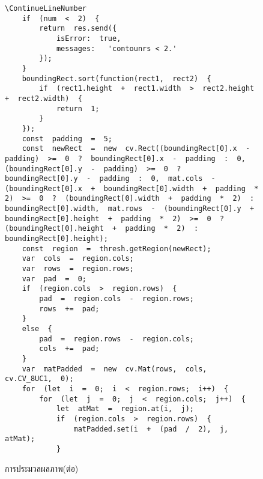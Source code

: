 	\begin{figure}[H]
		{\begin{lstlisting}\ContinueLineNumber
	if  (num  <  2)  {                
		return  res.send({                    
			isError:  true,  
			messages:   'contounrs < 2.'                
		});            
	}            
	boundingRect.sort(function(rect1,  rect2)  {                
		if  (rect1.height  +  rect1.width  >  rect2.height  +  rect2.width)  {                    
			return  1;                
		}            
	});            
	const  padding  =  5;            
	const  newRect  =  new  cv.Rect((boundingRect[0].x  -  padding)  >=  0  ?  boundingRect[0].x  -  padding  :  0,   (boundingRect[0].y  -  padding)  >=  0  ?  boundingRect[0].y  -  padding  :  0,  mat.cols  -  (boundingRect[0].x  +  boundingRect[0].width  +  padding  *  2)  >=  0  ?  (boundingRect[0].width  +  padding  *  2)  :  boundingRect[0].width,  mat.rows  -  (boundingRect[0].y  +  boundingRect[0].height  +  padding  *  2)  >=  0  ?  (boundingRect[0].height  +  padding  *  2)  :  boundingRect[0].height);
	const  region  =  thresh.getRegion(newRect);            
	var  cols  =  region.cols;            
	var  rows  =  region.rows;            
	var  pad  =  0;            
	if  (region.cols  >  region.rows)  {                
		pad  =  region.cols  -  region.rows;                
		rows  +=  pad;            
	}   
	else  {                
		pad  =  region.rows  -  region.cols;                
		cols  +=  pad;            
	}            
	var  matPadded  =  new  cv.Mat(rows,  cols,  cv.CV_8UC1,  0);            
	for  (let  i  =  0;  i  <  region.rows;  i++)  {                
		for  (let  j  =  0;  j  <  region.cols;  j++)  {                    
			let  atMat  =  region.at(i,  j);                    
			if  (region.cols  >  region.rows)  {                        
				matPadded.set(i  +  (pad  /  2),  j,  atMat);                    
			}   
		\end{lstlisting}}
		\caption{การประมวลผลภาพ(ต่อ)}
		\label{Fig:imageProcessing2}
	\end{figure}

